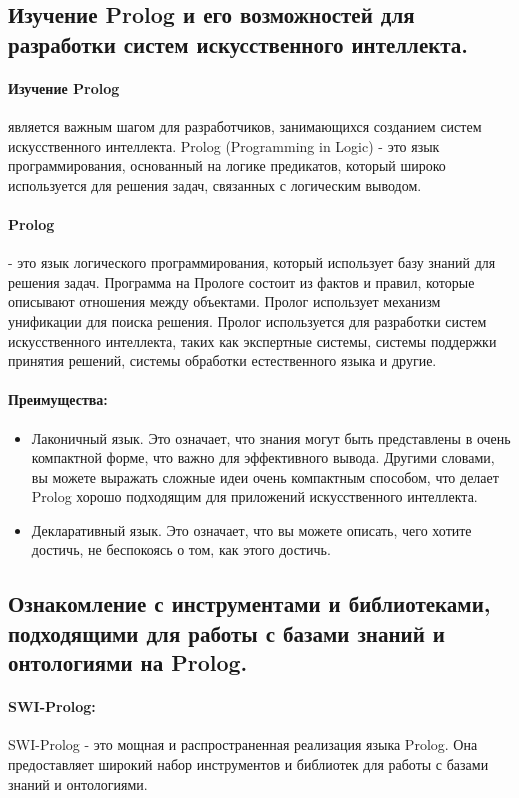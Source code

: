 \documentclass[12pt,onecolumn]{article}
\begin{document}
\subsection{Изучение Prolog и его возможностей для разработки систем искусственного интеллекта.}
\paragraph{Изучение Prolog} является важным шагом для разработчиков, занимающихся созданием систем искусственного интеллекта. Prolog (Programming in Logic) - это язык программирования, основанный на логике предикатов, который широко используется для решения задач, связанных с логическим выводом.
\paragraph{Prolog} - это язык логического программирования, который использует базу знаний для решения задач. Программа на Прологе состоит из фактов и правил, которые описывают отношения между объектами. Пролог использует механизм унификации для поиска решения. Пролог используется для разработки систем искусственного интеллекта, таких как экспертные системы, системы поддержки принятия решений, системы обработки естественного языка и другие.
\paragraph{Преимущества:}
\begin{itemize}
  \item Лаконичный язык. Это означает, что знания могут быть представлены в очень компактной форме, что важно для эффективного вывода. Другими словами, вы можете выражать сложные идеи очень компактным способом, что делает Prolog хорошо подходящим для приложений искусственного интеллекта. 
  \item Декларативный язык. Это означает, что вы можете описать, чего хотите достичь, не беспокоясь о том, как этого достичь.
\end{itemize}
\subsection{Ознакомление с инструментами и библиотеками, подходящими для работы с базами знаний и онтологиями на Prolog.}
\paragraph{SWI-Prolog:} SWI-Prolog - это мощная и распространенная реализация языка Prolog. Она предоставляет широкий набор инструментов и библиотек для работы с базами знаний и онтологиями.
\end{document}

